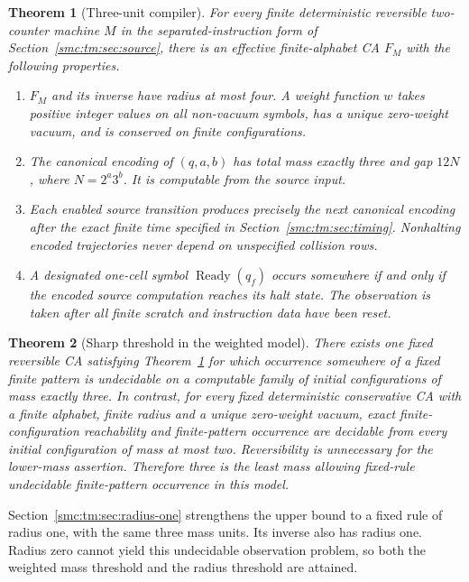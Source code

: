 \documentclass[11pt,letterpaper]{article}
\numberwithin{equation}{section}
\newtheorem{theorem}{Theorem}[section]
\theoremstyle{definition}
\theoremstyle{remark}
\newcommand{\Ready}{\operatorname{Ready}}
\begin{document}
\begin{theorem}[Three-unit compiler]\label{smc:tm:thm:compiler}
For every finite deterministic reversible two-counter machine $M$ in the separated-instruction form of Section~\ref{smc:tm:sec:source}, there is an effective finite-alphabet CA $F_M$ with the following properties.
\begin{enumerate}
\item $F_M$ and its inverse have radius at most four. A weight function $w$ takes positive integer values on all non-vacuum symbols, has a unique zero-weight vacuum, and is conserved on finite configurations.
\item The canonical encoding of $(q,a,b)$ has total mass exactly three and gap $12N$, where $N=2^a3^b$. It is computable from the source input.
\item Each enabled source transition produces precisely the next canonical encoding after the exact finite time specified in Section~\ref{smc:tm:sec:timing}. Nonhalting encoded trajectories never depend on unspecified collision rows.
\item A designated one-cell symbol $\Ready(q_f)$ occurs somewhere if and only if the encoded source computation reaches its halt state. The observation is taken after all finite scratch and instruction data have been reset.
\end{enumerate}
\end{theorem}

\begin{theorem}[Sharp threshold in the weighted model]\label{smc:tm:thm:threshold}
There exists one fixed reversible CA satisfying Theorem~\ref{smc:tm:thm:compiler} for which occurrence somewhere of a fixed finite pattern is undecidable on a computable family of initial configurations of mass exactly three. In contrast, for every fixed deterministic conservative CA with a finite alphabet, finite radius and a unique zero-weight vacuum, exact finite-configuration reachability and finite-pattern occurrence are decidable from every initial configuration of mass at most two. Reversibility is unnecessary for the lower-mass assertion. Therefore three is the least mass allowing fixed-rule undecidable finite-pattern occurrence in this model.
\end{theorem}

Section~\ref{smc:tm:sec:radius-one} strengthens the upper bound to a fixed rule of radius one, with the same three mass units. Its inverse also has radius one. Radius zero cannot yield this undecidable observation problem, so both the weighted mass threshold and the radius threshold are attained.
\end{document}
